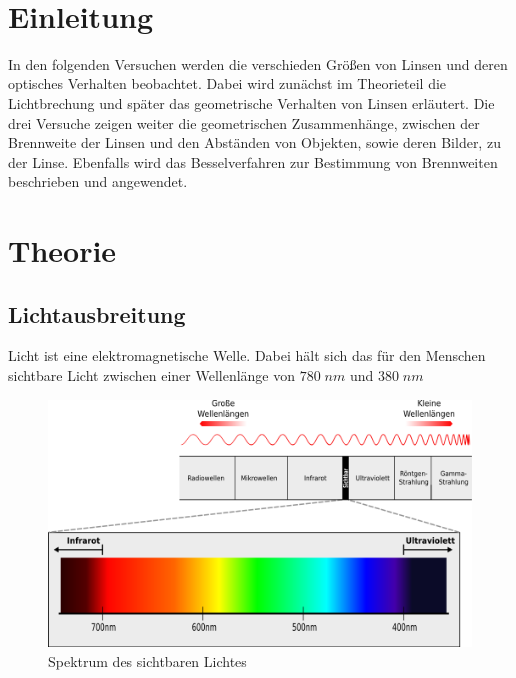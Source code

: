 \documentclass[a4paper]{scrartcl}
\def\header#1#2{
  \begin{center}
    {\Large #1}\\
    {#2}
  \end{center}
}
\numberwithin{equation}{subsection}
\begin{document}
\vspace{10pt}
\header{\HEADDING}{\SUBHEADDING}

\tableofcontents

\newpage

\section{Einleitung}

In den folgenden Versuchen werden die verschieden Größen von Linsen und deren optisches Verhalten beobachtet. Dabei wird zunächst im Theorieteil die Lichtbrechung und später das geometrische Verhalten von Linsen erläutert.
Die drei Versuche zeigen weiter die geometrischen Zusammenhänge, zwischen der Brennweite der Linsen und den Abständen von Objekten, sowie deren Bilder, zu der Linse. 
Ebenfalls wird das Besselverfahren zur Bestimmung von Brennweiten beschrieben und angewendet.

\newpage
\section{Theorie}

\subsection{Lichtausbreitung} 

Licht ist eine elektromagnetische Welle. Dabei hält sich das für den Menschen sichtbare Licht zwischen einer Wellenlänge von $780 \;nm$ und $380 \;nm$ \cite{hering}\\

\begin{figure}[H]
\includegraphics[width=12cm]{Abbildungen/Sichtbare-Wellenlaengen}
\centering
\caption{Spektrum des sichtbaren Lichtes \protect\footnotemark}
\centering
\label{fig:sichtbares-licht}
\end{figure}
\end{document}
